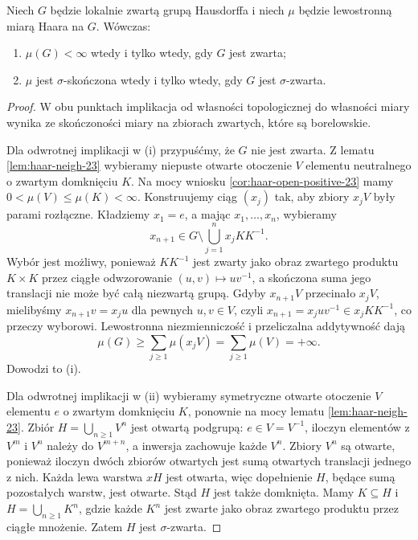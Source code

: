 \begin{wniosek}
\label{cor:haar-finiteness-23}
Niech $G$ będzie lokalnie zwartą grupą Hausdorffa
i niech $\mu$ będzie lewostronną miarą Haara na $G$.
Wówczas:
\begin{enumerate}[label=(\roman*)]
\item $\mu(G)<\infty$ wtedy i tylko wtedy, gdy $G$ jest zwarta;
\item $\mu$ jest $\sigma$-skończona wtedy i tylko wtedy,
      gdy $G$ jest $\sigma$-zwarta.
\end{enumerate}
\end{wniosek}
\begin{proof}
W obu punktach implikacja od własności topologicznej
do własności miary wynika ze skończoności miary
na zbiorach zwartych, które są borelowskie.

Dla odwrotnej implikacji w (i) przypuśćmy, że $G$
nie jest zwarta. Z lematu \ref{lem:haar-neigh-23}
wybieramy niepuste otwarte otoczenie $V$ elementu
neutralnego o zwartym domknięciu $K$.
Na mocy wniosku \ref{cor:haar-open-positive-23}
mamy $0<\mu(V)\le\mu(K)<\infty$.
Konstruujemy ciąg $(x_j)$ tak, aby zbiory $x_jV$
były parami rozłączne. Kładziemy $x_1=e$,
a mając $x_1,\dots,x_n$, wybieramy
\[
 x_{n+1}\in G\setminus\bigcup_{j=1}^n x_jKK^{-1}.
\]
Wybór jest możliwy, ponieważ $KK^{-1}$ jest zwarty
jako obraz zwartego produktu $K\times K$
przez ciągłe odwzorowanie $(u,v)\mapsto uv^{-1}$,
a skończona suma jego translacji nie może być
całą niezwartą grupą. Gdyby $x_{n+1}V$
przecinało $x_jV$, mielibyśmy
$x_{n+1}v=x_ju$ dla pewnych $u,v\in V$,
czyli $x_{n+1}=x_juv^{-1}\in x_jKK^{-1}$,
co przeczy wyborowi. Lewostronna niezmienniczość
i przeliczalna addytywność dają
\[
 \mu(G)\ge\sum_{j\ge1}\mu(x_jV)
 =\sum_{j\ge1}\mu(V)=+\infty.
\]
Dowodzi to (i).

Dla odwrotnej implikacji w (ii) wybieramy symetryczne
otwarte otoczenie $V$ elementu $e$ o zwartym
domknięciu $K$, ponownie na mocy lematu
\ref{lem:haar-neigh-23}. Zbiór
$H=\bigcup_{n\ge1}V^n$ jest otwartą podgrupą:
$e\in V=V^{-1}$, iloczyn elementów z $V^m$
i $V^n$ należy do $V^{m+n}$, a inwersja zachowuje
każde $V^n$. Zbiory $V^n$ są otwarte, ponieważ
iloczyn dwóch zbiorów otwartych jest sumą
otwartych translacji jednego z nich.
Każda lewa warstwa $xH$ jest otwarta, więc
dopełnienie $H$, będące sumą pozostałych warstw,
jest otwarte. Stąd $H$ jest także domknięta.
Mamy $K\subseteq H$ i
$H=\bigcup_{n\ge1}K^n$, gdzie każde $K^n$ jest
zwarte jako obraz zwartego produktu przez
ciągłe mnożenie. Zatem $H$ jest $\sigma$-zwarta.


\end{proof}

